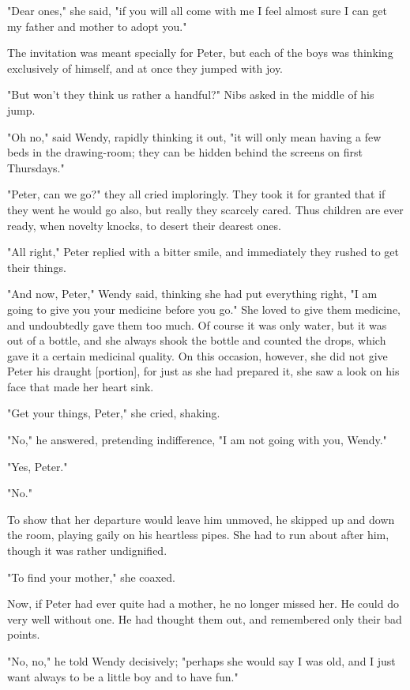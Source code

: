"Dear ones," she said, "if you will all come with me I feel almost sure I
can get my father and mother to adopt you."


The invitation was meant specially for Peter, but each of the boys was
thinking exclusively of himself, and at once they jumped with joy.


"But won't they think us rather a handful?" Nibs asked in the middle of
his jump.


"Oh no," said Wendy, rapidly thinking it out, "it will only mean having a
few beds in the drawing-room; they can be hidden behind the screens on
first Thursdays."


"Peter, can we go?" they all cried imploringly. They took it for granted
that if they went he would go also, but really they scarcely cared. Thus
children are ever ready, when novelty knocks, to desert their dearest
ones.


"All right," Peter replied with a bitter smile, and immediately they
rushed to get their things.


"And now, Peter," Wendy said, thinking she had put everything right, "I am
going to give you your medicine before you go." She loved to give them
medicine, and undoubtedly gave them too much. Of course it was only water,
but it was out of a bottle, and she always shook the bottle and counted
the drops, which gave it a certain medicinal quality. On this occasion,
however, she did not give Peter his draught [portion], for just as she had
prepared it, she saw a look on his face that made her heart sink.


"Get your things, Peter," she cried, shaking.


"No," he answered, pretending indifference, "I am not going with you,
Wendy."


"Yes, Peter."


"No."


To show that her departure would leave him unmoved, he skipped up and down
the room, playing gaily on his heartless pipes. She had to run about after
him, though it was rather undignified.


"To find your mother," she coaxed.


Now, if Peter had ever quite had a mother, he no longer missed her. He
could do very well without one. He had thought them out, and remembered
only their bad points.


"No, no," he told Wendy decisively; "perhaps she would say I was old, and
I just want always to be a little boy and to have fun."


